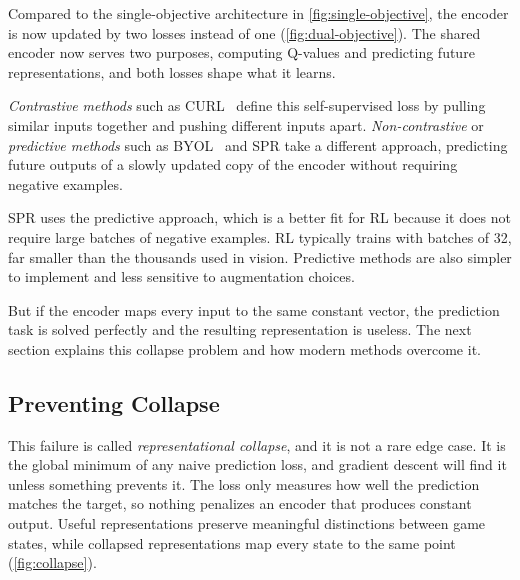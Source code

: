 \smallskip
Compared to the single-objective architecture in
\cref{fig:single-objective}, the encoder is now updated by two losses
instead of one (\cref{fig:dual-objective}). The shared encoder now
serves two purposes, computing Q-values and predicting future
representations, and both losses shape what it learns.

\FloatBarrier


\smallskip
\emph{Contrastive methods} such as CURL~\citep{laskin2020curl}
define this self-supervised loss by pulling similar inputs together
and pushing different inputs apart. \emph{Non-contrastive} or
\emph{predictive methods} such as BYOL~\citep{grill2020bootstrap}
and SPR take a different approach, predicting future outputs of a
slowly updated copy of the encoder without requiring negative
examples.

\smallskip
SPR uses the predictive approach, which is a better fit for RL
because it does not require large batches of negative examples. RL
typically trains with batches of 32, far smaller than the thousands
used in vision. Predictive methods are also simpler to implement and
less sensitive to augmentation choices.

\smallskip
But if the encoder maps every input to the same constant vector, the
prediction task is solved perfectly and the resulting representation
is useless. The next section explains this collapse problem and how
modern methods overcome it.

\subsection{Preventing Collapse}
\label{subsec:preventing-collapse}

This failure is called \emph{representational collapse}, and it is
not a rare edge case. It is the global minimum of any naive prediction
loss, and gradient descent will find it unless something prevents it.
The loss only measures how well the prediction matches the target, so
nothing penalizes an encoder that produces constant output. Useful
representations preserve meaningful distinctions between game states,
while collapsed representations map every state to the same point
(\cref{fig:collapse}).



